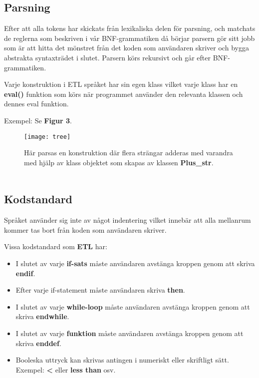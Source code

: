 \documentclass{TDP019mall}
\begin{document}
\newpage
\subsection{Parsning}
Efter att alla tokens har skickats från lexikaliska delen för parsning, och matchats de reglerna som beskriven i vår 
BNF-grammatiken då börjar parsern gör sitt jobb som är att hitta det mönstret från det koden som användaren skriver och bygga abstrakta 
syntaxträdet i slutet. Parsern körs rekursivt och går efter BNF-grammatiken. 

Varje konstruktion i ETL språket har sin egen klass vilket varje klass har en \textbf{eval()} funktion som körs när programmet använder
 den relevanta klassen och dennes eval funktion. 
 
Exempel: Se \textbf{Figur 3}.

\begin{figure}[h]
    \caption{Här parsas en konstruktion där flera strängar adderas med varandra med hjälp av klass objektet som skapas av klassen \textbf{Plus\_str}.\\ \\}
    \centering
    \texttt{[image: tree]}
\end{figure}

\newpage
\subsection{Kodstandard}
Språket använder sig inte av något indentering vilket innebär att alla mellanrum kommer tas bort från koden som användaren skriver. 

Vissa kodstandard som \textbf{ETL} har:
\begin{itemize}
\item I slutet av varje \textbf{if-sats} måste användaren avstänga kroppen genom att skriva \textbf{endif}.
\item Efter varje if-statement måste användaren skriva \textbf{then}.
\item I slutet av varje \textbf{while-loop} måste användaren avstänga kroppen genom att skriva \textbf{endwhile}.
\item I slutet av varje \textbf{funktion} måste användaren avstänga kroppen genom att skriva \textbf{enddef}.
\item Booleska uttryck kan skrivas antingen i numeriskt eller skriftligt sätt. Exempel: \textbf{<} eller \textbf{less than} osv.
\end{itemize}

\newpage
\end{document}
